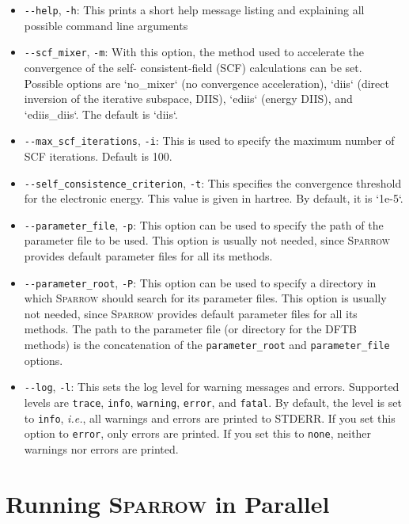 \documentclass[]{tufte-book}
\begin{document}
\begin{itemize}
\item \texttt{-{}-help}, \texttt{-h}: This prints a short help message listing and explaining all possible command line 
arguments
\item \texttt{-{}-scf\_mixer}, \texttt{-m}: With this option, the method used to accelerate the convergence of the self-
consistent-field (SCF) calculations can be set. Possible options are `no\_mixer` (no convergence acceleration), `diis`
(direct inversion of the iterative subspace, DIIS), `ediis` (energy DIIS), and `ediis\_diis`. The
default is `diis`.
\item \texttt{-{}-max\_scf\_iterations}, \texttt{-i}: This is used to specify the maximum number of SCF iterations. Default is 100.
\item \texttt{-{}-self\_consistence\_criterion}, \texttt{-t}: This specifies the convergence threshold for the electronic energy.
This value is given in hartree. By default, it is `1e-5`. 
\item \texttt{-{}-parameter\_file}, \texttt{-p}: This option can be used to specify the path of the parameter file to be
used. This option is usually not needed, since \textsc{Sparrow} provides default parameter files for all its methods.
\item \texttt{-{}-parameter\_root}, \texttt{-P}: This option can be used to specify a directory in which \textsc{Sparrow}
should search for its parameter files. This option is usually not needed, since \textsc{Sparrow} provides default parameter 
files for all its methods. The path to the parameter file (or directory for the DFTB methods) is the concatenation of
the \texttt{parameter\_root} and \texttt{parameter\_file} options.
\item \texttt{-{}-log}, \texttt{-l}: This sets the log level for warning messages and errors. Supported levels are 
\texttt{trace}, \texttt{info}, \texttt{warning}, \texttt{error}, and \texttt{fatal}. By default, the level is set to
\texttt{info}, \textit{i.e.}, all warnings and errors are printed to STDERR. If you set this option to \texttt{error}, 
only errors are printed. If you set this to \texttt{none}, neither warnings nor errors are printed.
\end{itemize}


\section{Running \textsc{Sparrow} in Parallel}
\end{document}
